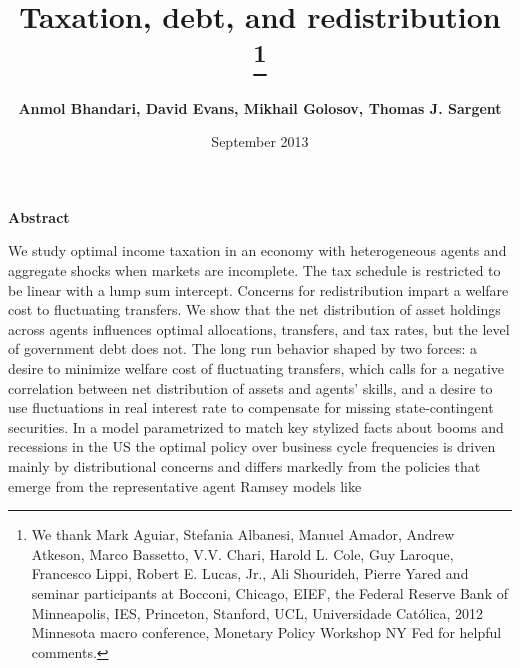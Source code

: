 \documentclass[thmsb,11pt]{article}
\begin{document}
\author{\textbf{Anmol Bhandari, David Evans, Mikhail Golosov, Thomas J. Sargent}%
}
\title{\textbf{Taxation, debt, and redistribution%
\thanks{%
We thank Mark Aguiar, Stefania Albanesi, Manuel Amador,  Andrew Atkeson, Marco Bassetto, V.V. Chari, Harold
L. Cole, Guy Laroque, Francesco Lippi, Robert E. Lucas, Jr., Ali Shourideh, Pierre Yared and seminar
participants at Bocconi, Chicago, EIEF, the Federal Reserve Bank of
Minneapolis, IES, Princeton, Stanford, UCL, Universidade Cat\'{o}lica, 2012
Minnesota macro conference, Monetary Policy Workshop NY Fed for helpful
comments.}}}
\date{September 2013}
\maketitle

\begin{center}
\textbf{Abstract}
\end{center}
We study optimal income taxation in an economy with heterogeneous agents and aggregate shocks when markets are incomplete. The tax schedule is restricted to be linear with a lump sum intercept. Concerns for redistribution impart a welfare cost to fluctuating transfers. We show that the net distribution of asset holdings across agents influences optimal allocations, transfers, and tax rates, but the level of government debt does not. The long run behavior shaped by two forces: a desire to minimize welfare cost of fluctuating transfers, which calls for a negative correlation between net distribution of assets and agents' skills, and a desire to use fluctuations in real interest rate to compensate for missing state-contingent securities. In a model parametrized to match key stylized facts about booms and recessions in the US the optimal policy over business cycle frequencies is driven mainly by distributional concerns and differs markedly from the policies that emerge from the representative agent Ramsey models 
like \citet{Aiyagari2002}

\medskip

% 
\end{document}

